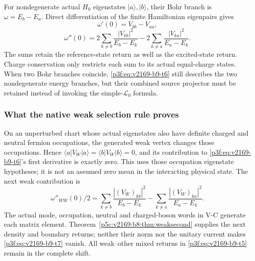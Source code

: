 \documentclass[11pt,a4paper]{article}
\begin{document}
For nondegenerate actual $H_0$ eigenstates $|a\rangle,|b\rangle$, their
Bohr branch is $\omega=E_b-E_a$. Direct differentiation of the finite
Hamiltonian eigenpairs gives
\[
 \boxed{\omega'(0)=V_{bb}-V_{aa},}
\]
\begin{equation}
 \boxed{\omega''(0)=
 2\sum_{k\ne b}\frac{|V_{kb}|^2}{E_b-E_k}
 -2\sum_{k\ne a}\frac{|V_{ka}|^2}{E_a-E_k}.}
 \label{p3f:eq:v2169-b9-t6}
\end{equation}
The sums retain the reference-state return as well as the excited-state
return. Charge conservation only restricts each sum to its actual equal-charge
states. When two Bohr branches coincide, \eqref{p3f:eq:v2169-b9-t6} still describes the two
nondegenerate energy branches, but their combined source projector must be
retained instead of invoking the simple-$\mathcal L_0$ formula.

\subsubsection{What the native weak selection rule proves}
On an unperturbed chart whose actual eigenstates also have definite charged
and neutral fermion occupations, the generated weak vertex changes those
occupations. Hence $\langle a|V_W|a\rangle=\langle b|V_W|b\rangle=0$,
and its contribution to \eqref{p3f:eq:v2169-b9-t6}'s first derivative is exactly zero.
This uses those occupation eigenstate hypotheses; it is not an assumed zero
mean in the interacting physical state. The next weak contribution is
\begin{equation}
 \omega''_{WW}(0)/2=
 \sum_{k\ne b}\frac{|(V_W)_{kb}|^2}{E_b-E_k}
 -\sum_{k\ne a}\frac{|(V_W)_{ka}|^2}{E_a-E_k}.
 \label{p3f:eq:v2169-b9-t7}
\end{equation}
The actual mode, occupation, neutral and charged-boson words in V-C generate
each matrix element. Theorem~\ref{p5c:v2169:b8:thm:weaksecond} supplies the next density and boundary returns;
neither their norm nor the unitary current makes \eqref{p3f:eq:v2169-b9-t7} vanish. All weak--other
mixed returns in \eqref{p3f:eq:v2169-b9-t5} remain in the complete shift.
\end{document}
